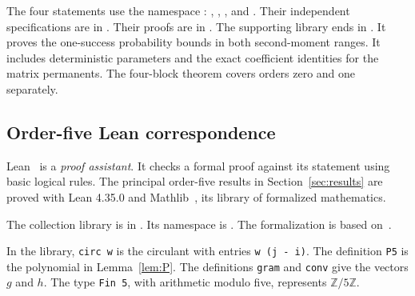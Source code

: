\documentclass[11pt,a4paper]{article}
\theoremstyle{definition}
\theoremstyle{remark}
\begin{document}
The four statements use the namespace :
, , , and .
Their independent specifications are in .
Their proofs are in .
The supporting library ends in .
It proves the one-success probability bounds in both second-moment ranges.
It includes deterministic parameters and the exact coefficient identities for the matrix permanents.
The four-block theorem covers orders zero and one separately.

\subsection{Order-five Lean correspondence}
Lean~\cite{lean} is a \emph{proof assistant}. It checks a formal proof against
its statement using basic logical rules. The principal order-five results in
Section~\ref{sec:results} are proved with Lean 4.35.0 and
Mathlib~\cite{mathlib}, its library of formalized mathematics.

The collection library is in
.
Its namespace is .
The formalization is based on~\cite{repo}.

In the library, \texttt{circ w} is the circulant with entries
\texttt{w (j - i)}. The definition \texttt{P5} is the polynomial in
Lemma~\ref{lem:P}. The definitions \texttt{gram} and \texttt{conv} give
the vectors $g$ and $h$. The type \texttt{Fin 5}, with arithmetic modulo
five, represents $\mathbb Z/5\mathbb Z$.
\end{document}
